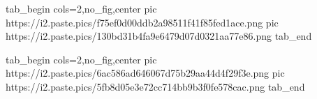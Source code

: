  
 
 
 
 
\zzSecCmtScr

\ifcmt
  tab_begin cols=2,no_fig,center
     pic https://i2.paste.pics/f75ef0d00ddb2a98511f41f85fed1ace.png
     pic https://i2.paste.pics/130bd31b4fa9e6479d07d0321aa77e86.png
  tab_end
\fi

\ifcmt
  tab_begin cols=2,no_fig,center
     pic https://i2.paste.pics/6ac586ad646067d75b29aa44d4f29f3e.png
     pic https://i2.paste.pics/5fb8d05e3e72cc714bb9b3f0fe578cac.png
  tab_end
\fi
